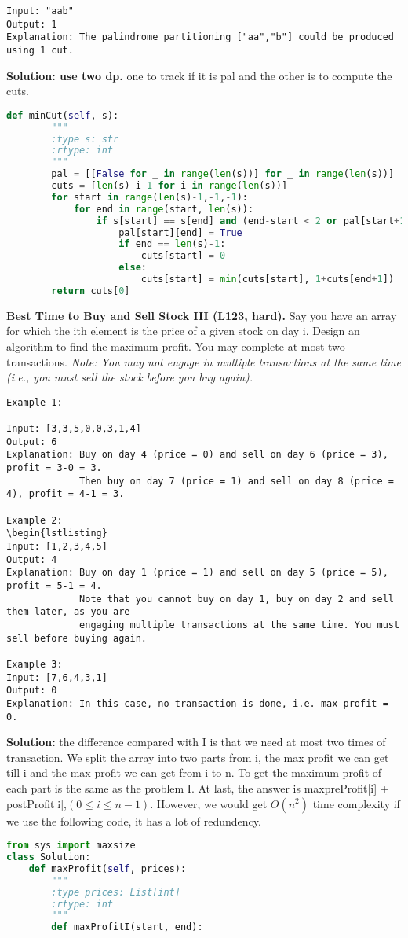\documentclass[../main.tex]{subfiles}
\begin{document}
\begin{examples}[resume]
\begin{lstlisting}[numbers=none]
Input: "aab"
Output: 1
Explanation: The palindrome partitioning ["aa","b"] could be produced using 1 cut.
\end{lstlisting}
\textbf{Solution: use two dp.} one to track if it is pal and the other is to compute the cuts. 
\begin{lstlisting}[language = Python]
    def minCut(self, s):
        """
        :type s: str
        :rtype: int
        """
        pal = [[False for _ in range(len(s))] for _ in range(len(s))]
        cuts = [len(s)-i-1 for i in range(len(s))]
        for start in range(len(s)-1,-1,-1):
            for end in range(start, len(s)):
                if s[start] == s[end] and (end-start < 2 or pal[start+1][end-1]):
                    pal[start][end] = True
                    if end == len(s)-1:
                        cuts[start] = 0
                    else:
                        cuts[start] = min(cuts[start], 1+cuts[end+1])
        return cuts[0]
\end{lstlisting}
\item \textbf{Best Time to Buy and Sell Stock III (L123, hard).} Say you have an array for which the ith element is the price of a given stock on day i. Design an algorithm to find the maximum profit. You may complete at most two transactions. \textit{Note: You may not engage in multiple transactions at the same time (i.e., you must sell the stock before you buy again).}
\begin{lstlisting}[numbers=none]
Example 1:

Input: [3,3,5,0,0,3,1,4]
Output: 6
Explanation: Buy on day 4 (price = 0) and sell on day 6 (price = 3), profit = 3-0 = 3.
             Then buy on day 7 (price = 1) and sell on day 8 (price = 4), profit = 4-1 = 3.

Example 2:
\begin{lstlisting}
Input: [1,2,3,4,5]
Output: 4
Explanation: Buy on day 1 (price = 1) and sell on day 5 (price = 5), profit = 5-1 = 4.
             Note that you cannot buy on day 1, buy on day 2 and sell them later, as you are
             engaging multiple transactions at the same time. You must sell before buying again.

Example 3:
Input: [7,6,4,3,1]
Output: 0
Explanation: In this case, no transaction is done, i.e. max profit = 0.
\end{lstlisting}
\textbf{Solution:} the difference compared with I is that we need at most two times of transaction. We split the array into two parts from i, the max profit we can get till i and the max profit we can get from i to n. To get the maximum profit of each part is the same as the problem I. At last, the answer is max{preProfit[i] + postProfit[i]},$(0\leq i\leq n-1)$. However, we would get $O(n^2)$ time complexity if we use the following code, it has a lot of redundency. 
\begin{lstlisting}[language=Python]
from sys import maxsize
class Solution:
    def maxProfit(self, prices):
        """
        :type prices: List[int]
        :rtype: int
        """
        def maxProfitI(start, end):
            

\end{lstlisting}
\end{examples}
\end{document}
